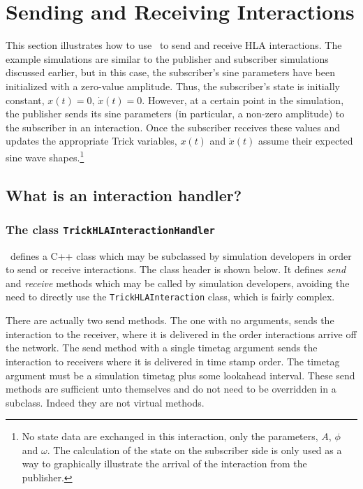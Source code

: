\chapter{Sending and Receiving Interactions}
\label{sec:hla-inter}

This section illustrates how to use \TrickHLA\ to
send and receive HLA interactions.
The example simulations are similar to the publisher and
subscriber simulations discussed earlier, but in this case,
the subscriber's sine parameters have been initialized with
a zero-value amplitude.
Thus, the subscriber's state is initially constant,
$x(t)=0$, $\dot{x}(t)=0$.
However, at a certain point in the simulation,
the publisher sends its sine parameters
(in particular, a non-zero amplitude)
to the subscriber in an interaction.
Once the subscriber receives these values and updates the appropriate
Trick variables, $x(t)$ and $\dot{x}(t)$ assume their expected sine wave
shapes.\footnote{
  No state data are exchanged in this interaction, only the
  \simplesine parameters, $A$, $\phi$ and $\omega$.
  The calculation of the state on the subscriber side is only used as a
  way to graphically illustrate the arrival of the interaction from the
  publisher.
}

\section{What is an interaction handler?}
\subsection{The class {\tt TrickHLAInteractionHandler}}

\TrickHLA\ defines a C++ class which may be subclassed by
simulation developers in order to send or receive interactions.
The class header is shown below.
It defines {\em send} and {\em receive} methods which may be called
by simulation developers,
avoiding the need to directly use the {\tt TrickHLAInteraction} class,
which is fairly complex.

There are actually two send methods.
The one with no arguments, sends the interaction to the receiver,
where it is delivered in the order interactions arrive off the network.
The send method with a single timetag argument sends the interaction
to receivers where it is delivered in time stamp order.
The timetag argument must be a simulation timetag plus some lookahead
interval.
These send methods are sufficient unto themselves and do not need to
be overridden in a subclass. Indeed they are not virtual methods.

